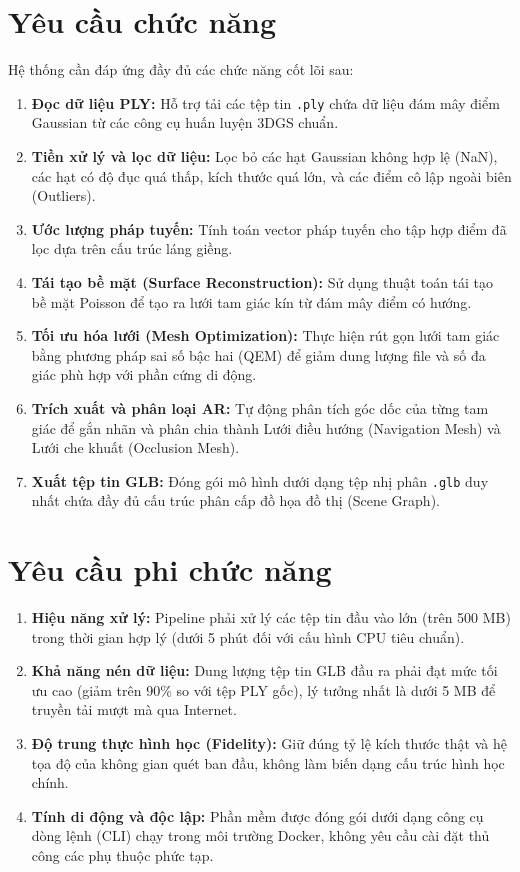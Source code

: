 \documentclass[a4paper,12pt]{report}
\begin{document}
\section{Yêu cầu chức năng}
Hệ thống cần đáp ứng đầy đủ các chức năng cốt lõi sau:
\begin{enumerate}
    \item \textbf{Đọc dữ liệu PLY:} Hỗ trợ tải các tệp tin \texttt{.ply} chứa dữ liệu đám mây điểm Gaussian từ các công cụ huấn luyện 3DGS chuẩn.
    \item \textbf{Tiền xử lý và lọc dữ liệu:} Lọc bỏ các hạt Gaussian không hợp lệ (NaN), các hạt có độ đục quá thấp, kích thước quá lớn, và các điểm cô lập ngoài biên (Outliers).
    \item \textbf{Ước lượng pháp tuyến:} Tính toán vector pháp tuyến cho tập hợp điểm đã lọc dựa trên cấu trúc láng giềng.
    \item \textbf{Tái tạo bề mặt (Surface Reconstruction):} Sử dụng thuật toán tái tạo bề mặt Poisson để tạo ra lưới tam giác kín từ đám mây điểm có hướng.
    \item \textbf{Tối ưu hóa lưới (Mesh Optimization):} Thực hiện rút gọn lưới tam giác bằng phương pháp sai số bậc hai (QEM) để giảm dung lượng file và số đa giác phù hợp với phần cứng di động.
    \item \textbf{Trích xuất và phân loại AR:} Tự động phân tích góc dốc của từng tam giác để gắn nhãn và phân chia thành Lưới điều hướng (Navigation Mesh) và Lưới che khuất (Occlusion Mesh).
    \item \textbf{Xuất tệp tin GLB:} Đóng gói mô hình dưới dạng tệp nhị phân \texttt{.glb} duy nhất chứa đầy đủ cấu trúc phân cấp đồ họa đồ thị (Scene Graph).
\end{enumerate}

\section{Yêu cầu phi chức năng}
\begin{enumerate}
    \item \textbf{Hiệu năng xử lý:} Pipeline phải xử lý các tệp tin đầu vào lớn (trên 500 MB) trong thời gian hợp lý (dưới 5 phút đối với cấu hình CPU tiêu chuẩn).
    \item \textbf{Khả năng nén dữ liệu:} Dung lượng tệp tin GLB đầu ra phải đạt mức tối ưu cao (giảm trên 90\% so với tệp PLY gốc), lý tưởng nhất là dưới 5 MB để truyền tải mượt mà qua Internet.
    \item \textbf{Độ trung thực hình học (Fidelity):} Giữ đúng tỷ lệ kích thước thật và hệ tọa độ của không gian quét ban đầu, không làm biến dạng cấu trúc hình học chính.
    \item \textbf{Tính di động và độc lập:} Phần mềm được đóng gói dưới dạng công cụ dòng lệnh (CLI) chạy trong môi trường Docker, không yêu cầu cài đặt thủ công các phụ thuộc phức tạp.
\end{enumerate}
\end{document}
